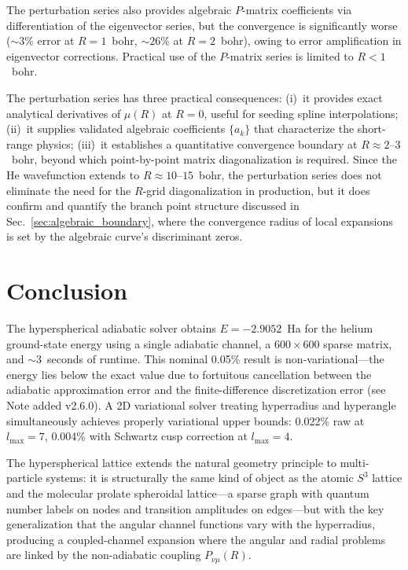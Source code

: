 \documentclass[aps,pra,twocolumn,superscriptaddress,longbibliography]{revtex4-2}
\begin{document}
The perturbation series also provides algebraic $P$-matrix
coefficients via differentiation of the eigenvector series, but the
convergence is significantly worse ($\sim\!3\%$ error at $R = 1$~bohr,
$\sim\!26\%$ at $R = 2$~bohr), owing to error amplification in
eigenvector corrections.  Practical use of the $P$-matrix series is
limited to $R < 1$~bohr.

The perturbation series has three practical consequences:
(i)~it provides exact analytical derivatives of $\mu(R)$ at $R = 0$,
useful for seeding spline interpolations;
(ii)~it supplies validated algebraic coefficients $\{a_k\}$ that
characterize the short-range physics;
(iii)~it establishes a quantitative convergence boundary at
$R \approx 2$--$3$~bohr, beyond which point-by-point matrix
diagonalization is required.  Since the He wavefunction extends to
$R \approx 10$--$15$~bohr, the perturbation series does not
eliminate the need for the $R$-grid diagonalization in production,
but it does confirm and quantify the branch point structure
discussed in Sec.~\ref{sec:algebraic_boundary}, where the
convergence radius of local expansions is set by the algebraic
curve's discriminant zeros.


\section{Conclusion}
\label{sec:conclusion}

The hyperspherical adiabatic solver obtains $E = -2.9052$~Ha for the
helium ground-state energy using a single adiabatic channel, a
$600 \times 600$ sparse matrix, and $\sim$3~seconds of runtime.
This nominal 0.05\% result is non-variational---the energy lies below
the exact value due to fortuitous cancellation between the adiabatic
approximation error and the finite-difference discretization error
(see Note added v2.6.0).  A 2D variational solver treating
hyperradius and hyperangle simultaneously achieves properly
variational upper bounds: 0.022\% raw at $l_{\max} = 7$, 0.004\%
with Schwartz cusp correction at $l_{\max} = 4$.

The hyperspherical lattice extends the natural geometry principle to
multi-particle systems: it is structurally the same kind of object
as the atomic $S^3$ lattice and the molecular prolate spheroidal
lattice---a sparse graph with quantum number labels on nodes and
transition amplitudes on edges---but with the key generalization
that the angular channel functions vary with the hyperradius,
producing a coupled-channel expansion where the angular and radial
problems are linked by the non-adiabatic coupling $P_{\nu\mu}(R)$.
\end{document}
